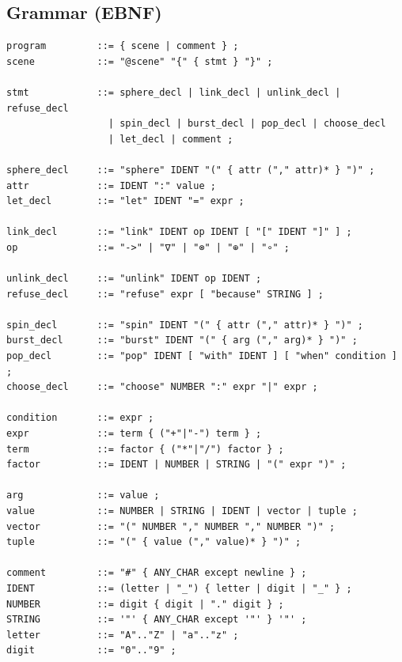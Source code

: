 \documentclass[12pt]{article}
\theoremstyle{definition}
\begin{document}
\subsection{Grammar (EBNF)}
\begin{verbatim}
program         ::= { scene | comment } ;
scene           ::= "@scene" "{" { stmt } "}" ;

stmt            ::= sphere_decl | link_decl | unlink_decl | refuse_decl
                  | spin_decl | burst_decl | pop_decl | choose_decl
                  | let_decl | comment ;

sphere_decl     ::= "sphere" IDENT "(" { attr ("," attr)* } ")" ;
attr            ::= IDENT ":" value ;
let_decl        ::= "let" IDENT "=" expr ;

link_decl       ::= "link" IDENT op IDENT [ "[" IDENT "]" ] ;
op              ::= "->" | "∇" | "⊗" | "⊕" | "∘" ;

unlink_decl     ::= "unlink" IDENT op IDENT ;
refuse_decl     ::= "refuse" expr [ "because" STRING ] ;

spin_decl       ::= "spin" IDENT "(" { attr ("," attr)* } ")" ;
burst_decl      ::= "burst" IDENT "(" { arg ("," arg)* } ")" ;
pop_decl        ::= "pop" IDENT [ "with" IDENT ] [ "when" condition ] ;
choose_decl     ::= "choose" NUMBER ":" expr "|" expr ;

condition       ::= expr ;
expr            ::= term { ("+"|"-") term } ;
term            ::= factor { ("*"|"/") factor } ;
factor          ::= IDENT | NUMBER | STRING | "(" expr ")" ;

arg             ::= value ;
value           ::= NUMBER | STRING | IDENT | vector | tuple ;
vector          ::= "(" NUMBER "," NUMBER "," NUMBER ")" ;
tuple           ::= "(" { value ("," value)* } ")" ;

comment         ::= "#" { ANY_CHAR except newline } ;
IDENT           ::= (letter | "_") { letter | digit | "_" } ;
NUMBER          ::= digit { digit | "." digit } ;
STRING          ::= '"' { ANY_CHAR except '"' } '"' ;
letter          ::= "A".."Z" | "a".."z" ;
digit           ::= "0".."9" ;
\end{verbatim}
\end{document}
